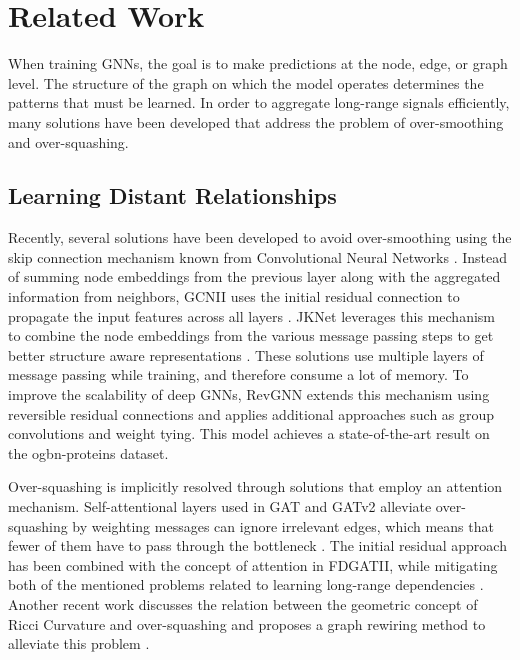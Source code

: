 \documentclass[nohyperref]{article}
\theoremstyle{plain}
\theoremstyle{definition}
\theoremstyle{remark}
\begin{document}
\section{Related Work}
When training GNNs, the goal is to make predictions at the node, edge, or graph level.
The structure of the graph on which the model operates determines the patterns that must be learned.
In order to aggregate long-range signals efficiently, many solutions have been developed that address the problem of over-smoothing and over-squashing.

\subsection{Learning Distant Relationships}
Recently, several solutions have been developed to avoid over-smoothing using the skip connection mechanism known from Convolutional Neural Networks \cite{li2019deepgcns, li2020deepergcn, gong2020geometrically, xu2021optimization}.
Instead of summing node embeddings from the previous layer along with the aggregated information from neighbors, GCNII uses the initial residual connection to propagate the input features across all layers \cite{chen2020simple}.
JKNet leverages this mechanism to combine the node embeddings from the various message passing steps to get better structure aware representations \cite{xu2018representation}.
These solutions use multiple layers of message passing while training, and therefore consume a lot of memory.
To improve the scalability of deep GNNs, RevGNN \cite{li2021training} extends this mechanism using reversible residual connections and applies additional approaches such as group convolutions and weight tying. This model achieves a state-of-the-art result on the ogbn-proteins dataset.

Over-squashing is implicitly resolved through solutions that employ an attention mechanism. 
Self-attentional layers used in GAT \cite{velickovic2018graph} and GATv2 \cite{brody2021attentive} alleviate over-squashing by weighting messages can ignore irrelevant edges, which means that fewer of them have to pass through the bottleneck \cite{alon2021bottleneck}. 
The initial residual approach has been combined with the concept of attention in FDGATII, while mitigating both of the mentioned problems related to learning long-range dependencies \cite{kulatilleke2021fdgatii}. 
Another recent work discusses the relation between the geometric concept of Ricci Curvature
and over-squashing and proposes a graph rewiring method to alleviate this problem \cite{topping2021understanding}.
\end{document}
